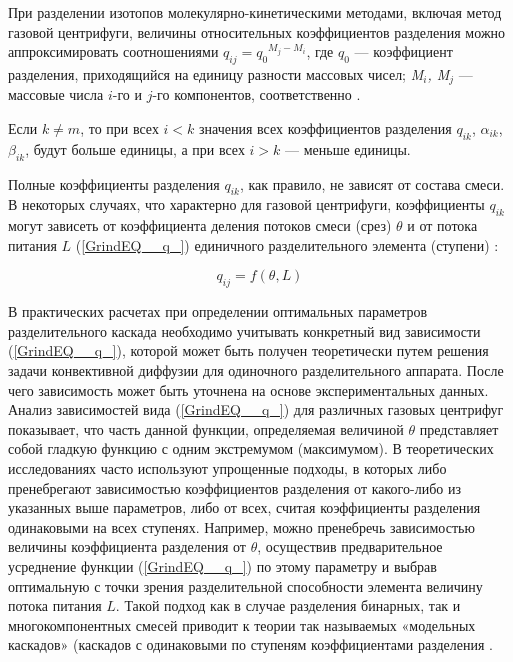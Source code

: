 При разделении изотопов молекулярно-кинетическими методами, включая метод газовой центрифуги, величины относительных коэффициентов разделения можно аппроксимировать соотношениями $q_{ij} =q_{0} {}^{M_{j} -M_{i} }$, где $q_0$ --- коэффициент разделения, приходящийся на единицу разности массовых чисел; \textit{M${}_{i}$, M${}_{j}$} --- массовые числа $i$-го и $j$-го компонентов, соответственно \cite{sulaberidzeTeoriyaKaskadovDlya2011}.

Если $k\ne m$, то при всех $i<k$ значения всех коэффициентов разделения $q_{ik}$, $\alpha _{ik}$, $\beta _{ik}$, будут больше единицы, а при всех $i>k$ --- меньше единицы.

Полные коэффициенты разделения $q_{ik} $, как правило, не зависят от состава смеси. В некоторых случаях, что характерно для газовой центрифуги, коэффициенты $q_{ik}$ могут зависеть от коэффициента деления потоков смеси (срез) $\theta$ и от потока питания $L$ (\ref{GrindEQ__q_}) единичного разделительного элемента (ступени) \cite{mustafinObjectiveFunctionOptimization2019}:

\begin{equation} \label{GrindEQ__q_} 
  q_{ij} = f(\theta, L)          
\end{equation}

В практических расчетах при определении оптимальных параметров разделительного каскада необходимо учитывать конкретный вид зависимости (\ref{GrindEQ__q_}), которой может быть получен теоретически путем решения задачи конвективной диффузии для одиночного разделительного аппарата. После чего зависимость может быть уточнена на основе экспериментальных данных. 
Анализ зависимостей вида (\ref{GrindEQ__q_}) для различных газовых центрифуг показывает, что часть данной функции, определяемая величиной $\theta $ представляет собой гладкую функцию с одним экстремумом (максимумом). В теоретических исследованиях часто используют упрощенные подходы, в которых либо пренебрегают зависимостью коэффициентов разделения от какого-либо из указанных выше параметров, либо от всех, считая коэффициенты разделения одинаковыми на всех ступенях. Например, можно пренебречь зависимостью величины коэффициента разделения от $\theta$, осуществив предварительное усреднение функции (\ref{GrindEQ__q_}) по этому параметру и выбрав оптимальную с точки зрения разделительной способности элемента величину потока питания $L$. Такой подход как в случае разделения бинарных, так и многокомпонентных смесей приводит к теории так называемых «модельных каскадов» (каскадов с одинаковыми по ступеням коэффициентами разделения \cite{sulaberidzeClassificationModelCascades2020}.

